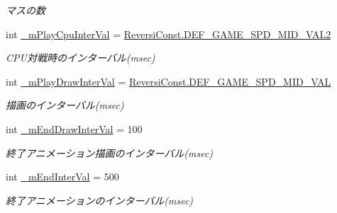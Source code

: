 \begin{DoxyCompactItemize}
\begin{DoxyCompactList}\small\item\em マスの数 \end{DoxyCompactList}\item 
\mbox{\label{class_reversi_wpf_1_1_reversi_setting_a7cd5ba8099417e8e7ccad8c94eef690d}} 
int \hyperlink{class_reversi_wpf_1_1_reversi_setting_a7cd5ba8099417e8e7ccad8c94eef690d}{\+\_\+m\+Play\+Cpu\+Inter\+Val} = \hyperlink{class_reversi_wpf_1_1_reversi_const_a83bd3f7ec5a5dd0ac38551e786de9b63}{Reversi\+Const.\+D\+E\+F\+\_\+\+G\+A\+M\+E\+\_\+\+S\+P\+D\+\_\+\+M\+I\+D\+\_\+\+V\+A\+L2}
\begin{DoxyCompactList}\small\item\em C\+P\+U対戦時のインターバル(msec) \end{DoxyCompactList}\item 
\mbox{\label{class_reversi_wpf_1_1_reversi_setting_ad71c036918fecaa5971a404c55fb2cdd}} 
int \hyperlink{class_reversi_wpf_1_1_reversi_setting_ad71c036918fecaa5971a404c55fb2cdd}{\+\_\+m\+Play\+Draw\+Inter\+Val} = \hyperlink{class_reversi_wpf_1_1_reversi_const_a51e3ebd11feb1dd8b7bd72dceebc709a}{Reversi\+Const.\+D\+E\+F\+\_\+\+G\+A\+M\+E\+\_\+\+S\+P\+D\+\_\+\+M\+I\+D\+\_\+\+V\+AL}
\begin{DoxyCompactList}\small\item\em 描画のインターバル(msec) \end{DoxyCompactList}\item 
\mbox{\label{class_reversi_wpf_1_1_reversi_setting_aa49fffe81e15a7ff28e35ec92aa36cc6}} 
int \hyperlink{class_reversi_wpf_1_1_reversi_setting_aa49fffe81e15a7ff28e35ec92aa36cc6}{\+\_\+m\+End\+Draw\+Inter\+Val} = 100
\begin{DoxyCompactList}\small\item\em 終了アニメーション描画のインターバル(msec) \end{DoxyCompactList}\item 
\mbox{\label{class_reversi_wpf_1_1_reversi_setting_aab40ac37e1ef60e577703a0efa3fc163}} 
int \hyperlink{class_reversi_wpf_1_1_reversi_setting_aab40ac37e1ef60e577703a0efa3fc163}{\+\_\+m\+End\+Inter\+Val} = 500
\begin{DoxyCompactList}\small\item\em 終了アニメーションのインターバル(msec) \end{DoxyCompactList}\item 

\end{DoxyCompactItemize}
